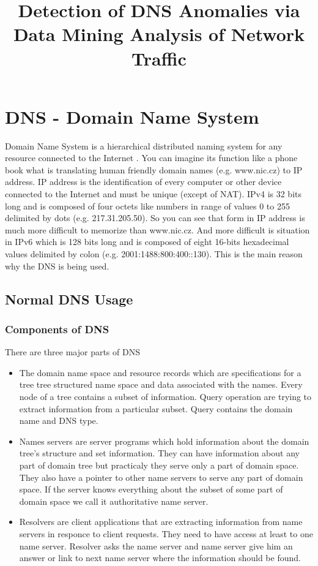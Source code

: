 \documentclass[thesis=M,english]{FITthesis}[2012/10/20]
\title{Detection of DNS Anomalies via Data Mining Analysis of Network Traffic}
\begin{document}

\begin{introduction}

\end{introduction}

\chapter{DNS - Domain Name System}\label{dns}
Domain Name System is a hierarchical distributed naming system for any resource connected to the Internet \cite{wik14}. You can imagine its function like a phone book what is translating human friendly domain names (e.g. www.nic.cz) to IP address. IP address is the identification of every computer or other device connected to the Internet and must be unique (except of NAT). IPv4 is 32 bits long and is composed of four octets like numbers in range of values 0 to 255 delimited by dots (e.g. 217.31.205.50). So you can see that form in IP address is much more difficult to memorize than www.nic.cz. And more difficult is situation in IPv6 which is 128 bits long and is composed of eight 16-bits hexadecimal values delimited by colon (e.g. 2001:1488:800:400::130). This is the main reason why the DNS is being used.

\section{Normal DNS Usage}
\subsection{Components of DNS}
There are three major parts of DNS \cite{Moc87}
\begin{itemize}
\item The domain name space and resource records which are specifications for a tree tree structured name space and data associated with the names. Every node of a tree contains a subset of information. Query operation are trying to extract information from a particular subset. Query contains the domain name and DNS type.
\item Names servers are server programs which hold information about the domain tree's structure and set information. They can have information about any part of domain tree but practicaly they serve only a part of domain space. They also have a pointer to other name servers to serve any part of domain space. If the server knows everything about the subset of some part of domain space we call it authoritative name server.
\item Resolvers are client applications that are extracting information from name servers in responce to client requests. They need to have access at least to one name server. Resolver asks the name server and name server give him an answer or link to next name server where the information should be found.
\end{itemize}
\end{document}
